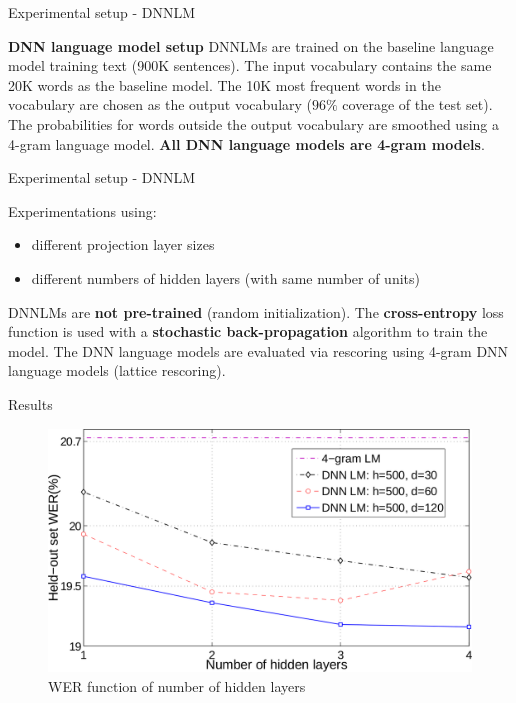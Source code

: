 \documentclass{beamer}
\begin{document}
\begin{frame}{Experimental setup - \small{DNNLM}}

\textbf{DNN language model setup}
\newline
\newline
DNNLMs are trained on the baseline language model training text (900K sentences).
\newline
\newline
The input vocabulary contains the same 20K words as the baseline model.
\newline
The 10K most frequent words in the vocabulary are chosen as the output vocabulary ($96\%$ coverage of the test set).
\newline
\newline
The probabilities for words outside the output vocabulary are smoothed using a 4-gram language model.
\newline
\newline
\textbf{All DNN language models are 4-gram models}.
\end{frame}

\begin{frame}{Experimental setup - \small{DNNLM}}

Experimentations using:
\begin{itemize}
	\item different projection layer sizes
	\item different numbers of hidden layers (with same number of units)
\end{itemize}

\bigskip
DNNLMs are \textbf{not pre-trained} (random initialization).
\newline
\newline
The \textbf{cross-entropy} loss function is used with a \textbf{stochastic back-propagation} algorithm to train the model.
\newline
\newline
The DNN language models are evaluated via rescoring using 4-gram DNN language models (lattice rescoring).

\end{frame}

\begin{frame}{Results}
	\begin{figure}[!htb]
		\centering
	    \includegraphics[width=0.8\linewidth]{./images/results1.png}
	    \caption{WER function of number of hidden layers}
	\end{figure}
\end{frame}
\end{document}
